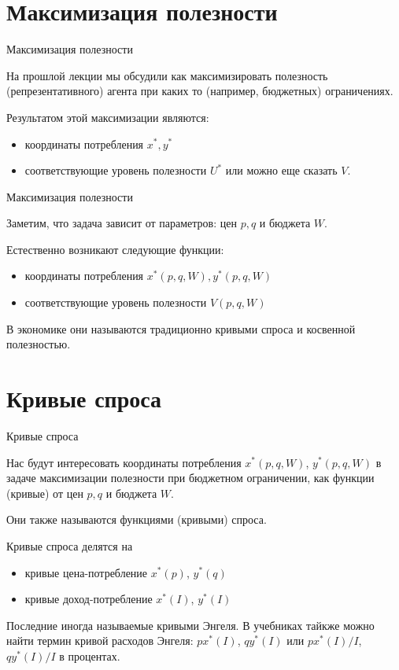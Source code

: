 \documentclass{beamer}
\begin{document}
\section{Максимизация полезности}

\begin{frame}{Максимизация полезности}

На прошлой лекции мы обсудили как максимизировать полезность (репрезентативного) агента при каких то (например, бюджетных) ограничениях.

Результатом этой максимизации являются:
\begin{itemize}
  \item координаты потребления $x^*,y^*$
  \item соответствующие уровень полезности $U^*$ или можно еще сказать $V$.
\end{itemize}

\end{frame}

\begin{frame}{Максимизация полезности}

Заметим, что задача зависит от параметров: цен $p,q$ и бюджета $W$. 

Естественно возникают следующие функции:
\begin{itemize}
  \item координаты потребления $x^*(p,q,W),y^*(p,q,W)$
  \item соответствующие уровень полезности $V(p,q,W)$
\end{itemize}

В экономике они называются традиционно \alert{кривыми спроса} и \alert{косвенной полезностью}.

\end{frame}

\section{Кривые спроса}

\begin{frame}{Кривые спроса}

Нас будут интересовать координаты потребления $x^{\ast}(p,q,W)$, $y^{\ast}(p,q,W)$ в задаче максимизации полезности при бюджетном ограничении, как функции (кривые) от цен $p,q$ и бюджета $W$. 

Они также называются \alert{функциями (кривыми) спроса}.

\begin{definition}
Кривые спроса делятся на 
\begin{itemize}
  \item кривые \alert{цена-потребление} $x^{\ast}(p)$, $y^{\ast}(q)$
  \item кривые \alert{доход-потребление} $x^{\ast}(I)$, $y^{\ast}(I)$
\end{itemize}
\end{definition}
Последние иногда называемые \alert{кривыми Энгеля}. В учебниках тайкже можно найти термин \alert{кривой расходов Энгеля}: $p x^{\ast}(I)$, $q y^{\ast}(I)$ или $p x^{\ast}(I)/I$, $q y^{\ast}(I)/I$ в процентах.

\end{frame}
\end{document}
